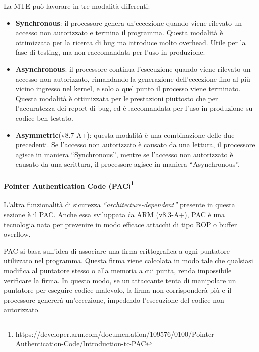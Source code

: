 \bigskip
La MTE può lavorare in tre modalità differenti:
\begin{itemize}
  \item \textbf{Synchronous}: il processore genera un'eccezione quando viene rilevato
    un accesso non autorizzato e termina il programma. Questa modalità è
    ottimizzata per la ricerca di bug ma introduce molto overhead. Utile per la fase
    di testing, ma non raccomandata per l'uso in produzione.

  \item \textbf{Asynchronous}: il processore continua l'esecuzione quando viene rilevato
    un accesso non autorizzato, rimandando la generazione dell'eccezione fino al
    più vicino ingresso nel kernel, e solo a quel punto il processo viene terminato.
    Questa modalità è ottimizzata per le prestazioni piuttosto che per l'accuratezza
    dei report di bug, ed è raccomandata per l'uso in produzione su codice ben testato.

  \item \textbf{Asymmetric}(v8.7-A+): questa modalità è una combinazione delle
    due precedenti. Se l'accesso non autorizzato è causato da una lettura, il
    processore agisce in maniera ``Synchronous'', mentre se l'accesso non autorizzato
    è causato da una scrittura, il processore agisce in maniera ``Asynchronous''.
\end{itemize}

\paragraph{Pointer Authentication Code (PAC)\protect\footnote{https://developer.arm.com/documentation/109576/0100/Pointer-Authentication-Code/Introduction-to-PAC}}
L'altra funzionalità di sicurezza \textit{``architecture-dependent''} presente in
questa sezione è il PAC. Anche essa sviluppata da ARM (v8.3-A+), PAC è una tecnologia
nata per prevenire in modo efficace attacchi di tipo ROP o buffer overflow.

PAC si basa sull'idea di associare una firma crittografica a ogni puntatore utilizzato
nel programma. Questa firma viene calcolata in modo tale che qualsiasi modifica
al puntatore stesso o alla memoria a cui punta, renda impossibile verificare la firma.
In questo modo, se un attaccante tenta di manipolare un puntatore per eseguire codice
malevolo, la firma non corrisponderà più e il processore genererà un'eccezione, impedendo
l'esecuzione del codice non autorizzato.

